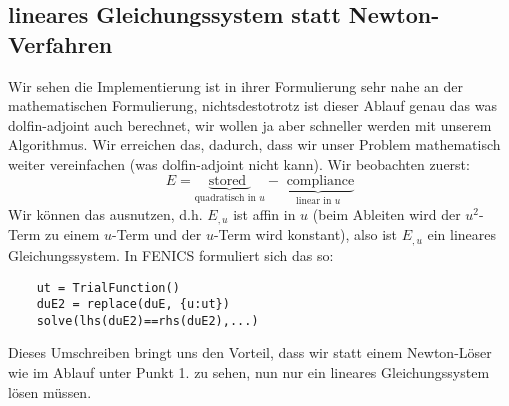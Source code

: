 \documentclass[a4paper, 12pt]{scrartcl}
\begin{document}
	\subsection{lineares Gleichungssystem statt Newton-Verfahren}
	
	Wir sehen die Implementierung ist in ihrer Formulierung sehr nahe an der mathematischen Formulierung, nichtsdestotrotz ist dieser Ablauf genau das was dolfin-adjoint auch berechnet, wir wollen ja aber schneller werden mit unserem Algorithmus. Wir erreichen das, dadurch, dass wir unser Problem mathematisch weiter vereinfachen (was dolfin-adjoint nicht kann). Wir beobachten zuerst:
	\begin{equation}
		E = \underbrace{\text{stored }}_{\text{quadratisch in }u}- \underbrace{\text{ compliance}}_{\text{linear in }u}
		\label{Grundgleichung}
	\end{equation}
	Wir können das ausnutzen, d.h. $E_{,u}$  ist affin in $u$ (beim Ableiten wird der $u^2$-Term zu einem $u$-Term und der $u$-Term wird konstant), also ist $E_{,u}$ ein lineares Gleichungssystem. In FENICS formuliert sich das so:
	\begin{verbatim}
	ut = TrialFunction()
	duE2 = replace(duE, {u:ut})
	solve(lhs(duE2)==rhs(duE2),...)
	\end{verbatim}
	Dieses Umschreiben bringt uns den Vorteil, dass wir statt einem Newton-Löser wie im Ablauf unter Punkt 1. zu sehen, nun nur ein lineares Gleichungssystem lösen müssen.
\end{document}
